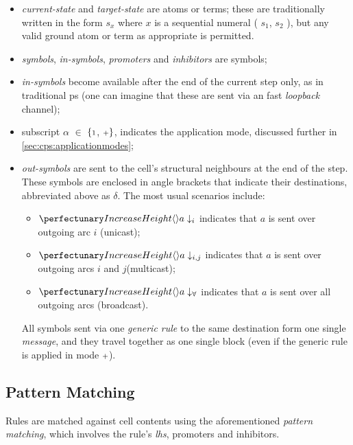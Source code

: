 \begin{itemize}
\item \textit{current-state} and \textit{target-state} are atoms or terms;  these are traditionally written in the form \(s_x\) where \(x\) is a sequential numeral (\eg{} \(s_1\), \(s_2\) \etc{}), but any valid ground atom or term as appropriate is permitted.

\smallskip
\item \textit{symbols}, \textit{in-symbols}, \textit{\glspl{promoter}} and \textit{\glspl{inhibitor}} are symbols;

\smallskip
\item \textit{in-symbols} become available after the end of the current step only, as in traditional \gls{ps}  (one can imagine that these are sent via an \adhoc{} fast \textit{loopback} channel); 

\smallskip
\item subscript \(\alpha\) \(\in\) \(\{{\scriptstyle 1}\), \({\scriptstyle +}\}\), 
indicates the application mode, discussed further in \cref{sec:cps:applicationmodes};

\smallskip
\item \textit{out-symbols} are sent to the cell's structural neighbours at the end of the step.
These symbols are enclosed in angle brackets that indicate 
their destinations, abbreviated above as \(\delta\). 
The most usual scenarios include: 

\begin{itemize}
\item \(\cpoutsymbol{a}{i}\) indicates that \(a\) is sent over outgoing arc \(i\) (unicast); 

\item \(\cpoutsymbol{a}{i,j}\) indicates that \(a\) is sent over outgoing arcs \(i\) and \(j\)(multicast); 

\item \(\cpoutsymbolall{a}\) indicates that \(a\) is sent over all outgoing arcs (broadcast). 
\end{itemize}

All symbols sent via one \emph{generic rule} to the same destination form one single \emph{message}, and they travel together as one single block (even if the generic rule is applied in mode \({\scriptstyle +}\)).
\end{itemize}

\subsection{Pattern Matching}
Rules are matched against cell contents using the aforementioned \emph{pattern matching},
which involves the rule's \emph{\gls{lhs}}, \glspl{promoter} and \glspl{inhibitor}.


